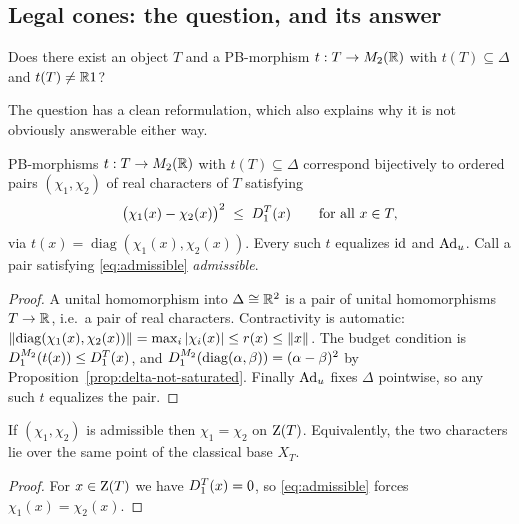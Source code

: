 \subsection{Legal cones: the question, and its answer}

\begin{question}\label{q:legal-cone}
Does there exist an object $T$ and a PB-morphism $t:T\to M_2(\mathbb{R})$ with
$t(T)\subseteq\Delta$ and $t(T)\ne\mathbb{R}1$?
\end{question}

The question has a clean reformulation, which also explains why it is not
obviously answerable either way.

\begin{lemma}\label{lem:cones-characters}
PB-morphisms $t:T\to M_2(\mathbb{R})$ with $t(T)\subseteq\Delta$ correspond bijectively
to ordered pairs $(\chi_1,\chi_2)$ of real characters of $T$ satisfying
\begin{equation}\label{eq:admissible}
  \bigl(\chi_1(x)-\chi_2(x)\bigr)^2\;\le\;D_1^T(x)\qquad\text{for all }x\in T,
\end{equation}
via $t(x)=\operatorname{diag}(\chi_1(x),\chi_2(x))$.  Every such $t$ equalizes
$\operatorname{id}$ and $\operatorname{Ad}_u$.  Call a pair satisfying \eqref{eq:admissible}
\emph{admissible}.
\end{lemma}

\begin{proof}
A unital homomorphism into $\Delta\cong\mathbb{R}^2$ is a pair of unital
homomorphisms $T\to\mathbb{R}$, i.e.\ a pair of real characters.  Contractivity is
automatic: $\left\lVert\operatorname{diag}(\chi_1(x),\chi_2(x))\right\rVert=\max_i\left\lvert\chi_i(x)\right\rvert\le r(x)\le\left\lVert x\right\rVert$.
The budget condition is $D_1^{M_2}(t(x))\le D_1^T(x)$, and
$D_1^{M_2}(\operatorname{diag}(\alpha,\beta))=(\alpha-\beta)^2$ by
Proposition~\ref{prop:delta-not-saturated}.  Finally $\operatorname{Ad}_u$ fixes $\Delta$
pointwise, so any such $t$ equalizes the pair.
\end{proof}

\begin{lemma}\label{lem:agree-on-centre}
If $(\chi_1,\chi_2)$ is admissible then $\chi_1=\chi_2$ on $\operatorname{Z}(T)$.
Equivalently, the two characters lie over the same point of the classical base
$X_T$.
\end{lemma}

\begin{proof}
For $x\in\operatorname{Z}(T)$ we have $D_1^T(x)=0$, so \eqref{eq:admissible} forces
$\chi_1(x)=\chi_2(x)$.
\end{proof}

